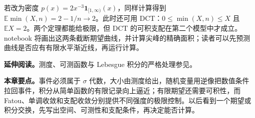 若改为密度 $p(x)=2x^{-3}\mathbf1_{[1,\infty)}(x)$，同样计算得到 $\mathbb E\min(X,n)=2-1/n\to2$。此时还可用 DCT：$0\leq\min(X,n)\leq X$ 且 $\mathbb EX=2$。两个定理都能给极限，但 DCT 的可积支配在第二个模型中才成立。notebook 将画出这两条截断期望曲线，并计算尖峰的精确面积；读者可以先预测曲线是否应有有限水平渐近线，再运行计算。

\noindent\textbf{延伸阅读。}测度、可测函数与 Lebesgue 积分的严格处理参见\cite{folland1999analysis}。




\noindent\textbf{本章要点。}事件必须属于 $\sigma$ 代数，大小由测度给出，随机变量用逆像把数值条件拉回事件，积分从简单函数的有限记录向上逼近；有限期望还需要可积性，而 Fatou、单调收敛和支配收敛分别提供不同强度的极限控制。以后看到一个期望或积分交换，先写出空间、可测性和支配条件，再决定能否计算。
